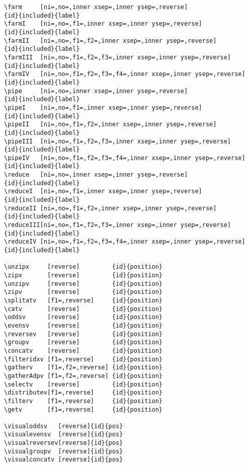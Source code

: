 \begin{lstlisting}
\farm     [ni=,no=,inner xsep=,inner ysep=,reverse]                {id}{included}{label}
\farmI    [ni=,no=,f1=,inner xsep=,inner ysep=,reverse]            {id}{included}{label}
\farmII   [ni=,no=,f1=,f2=,inner xsep=,inner ysep=,reverse]        {id}{included}{label}
\farmIII  [ni=,no=,f1=,f2=,f3=,inner xsep=,inner ysep=,reverse]    {id}{included}{label}
\farmIV   [ni=,no=,f1=,f2=,f3=,f4=,inner xsep=,inner ysep=,reverse]{id}{included}{label}
\pipe     [ni=,no=,inner xsep=,inner ysep=,reverse]                {id}{included}{label}
\pipeI    [ni=,no=,f1=,inner xsep=,inner ysep=,reverse]            {id}{included}{label}
\pipeII   [ni=,no=,f1=,f2=,inner xsep=,inner ysep=,reverse]        {id}{included}{label}
\pipeIII  [ni=,no=,f1=,f2=,f3=,inner xsep=,inner ysep=,reverse]    {id}{included}{label}
\pipeIV   [ni=,no=,f1=,f2=,f3=,f4=,inner xsep=,inner ysep=,reverse]{id}{included}{label}
\reduce   [ni=,no=,inner xsep=,inner ysep=,reverse]                {id}{included}{label}
\reduceI  [ni=,no=,f1=,inner xsep=,inner ysep=,reverse]            {id}{included}{label}
\reduceII [ni=,no=,f1=,f2=,inner xsep=,inner ysep=,reverse]        {id}{included}{label}
\reduceIII[ni=,no=,f1=,f2=,f3=,inner xsep=,inner ysep=,reverse]    {id}{included}{label}
\reduceIV [ni=,no=,f1=,f2=,f3=,f4=,inner xsep=,inner ysep=,reverse]{id}{included}{label}

\unzipx     [reverse]         {id}{position}
\zipx       [reverse]         {id}{position}
\unzipv     [reverse]         {id}{position}
\zipv       [reverse]         {id}{position}
\splitatv   [f1=,reverse]     {id}{position}
\catv       [reverse]         {id}{position}
\oddsv      [reverse]         {id}{position}
\evensv     [reverse]         {id}{position}
\reversev   [reverse]         {id}{position}
\groupv     [reverse]         {id}{position}
\concatv    [reverse]         {id}{position}
\filteridxv [f1=,reverse]     {id}{position}
\gatherv    [f1=,f2=,reverse] {id}{position}
\gatherAdpv [f1=,f2=,reverse] {id}{position}
\selectv    [reverse]         {id}{position}
\distributev[f1=,reverse]     {id}{position}
\filterv    [f1=,reverse]     {id}{position}
\getv       [f1=,reverse]     {id}{position}

\visualoddsv   [reverse]{id}{pos}
\visualevensv  [reverse]{id}{pos}
\visualreversev[reverse]{id}{pos}
\visualgroupv  [reverse]{id}{pos}
\visualconcatv [reverse]{id}{pos}
\end{lstlisting}


